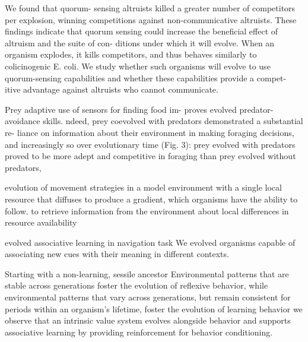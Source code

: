 \citep{johnson_more_2014}
We found that quorum- sensing altruists killed a greater number of competitors per explosion, winning competitions against non-communicative altruists. These findings indicate that quorum sensing could increase the beneficial effect of altruism and the suite of con- ditions under which it will evolve.
When an organism explodes, it kills competitors, and thus behaves similarly to colicinogenic E. coli. We study whether such organisms will evolve to use quorum-sensing capabilities and whether these capabilities provide a compet- itive advantage against altruists who cannot communicate.


\citep{wagner_behavioral_2014}
 Prey adaptive use of sensors for finding food im- proves evolved predator-avoidance skills.
 ndeed, prey coevolved with predators demonstrated a substantial re- liance on information about their environment in making foraging decisions, and increasingly so over evolutionary time (Fig. 3):
prey evolved with predators proved to be more adept and competitive in foraging than prey evolved without predators, 

\citep{elsberry_cockroaches_2009}
evolution of movement strategies in a model environment with a single local resource that diffuses to produce a gradient, which organisms have the ability to follow.
 to retrieve information from the environment about local differences in resource availability
 
 
\citep{pontes_investigations_2017}
evolved associative learning in navigation task
We evolved organisms capable of associating new cues with their meaning in different contexts.

\citep{pontes_evolutionary_2019}
Starting with a non-learning, sessile ancestor
Environmental patterns that are stable across generations foster the evolution of reflexive behavior, while environmental patterns that vary across generations, but remain consistent for periods within an organism’s lifetime, foster the evolution of learning behavior
we observe that an intrinsic value system evolves alongside behavior and supports associative learning by providing reinforcement for behavior conditioning.
